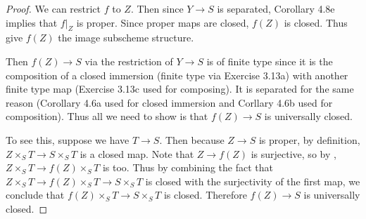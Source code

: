 \begin{proof}
	We can restrict $f $ to $Z $.
	Then since $Y \to S $ is separated, Corollary 4.8e implies that $f\left.\right|_{Z} $ is proper.
	Since proper maps are closed, $f(Z) $ is closed.
	Thus give $f(Z) $ the image subscheme structure.

	Then $f(Z) \to S $ via the restriction of $Y\to S $ is of finite type since it is the composition of a closed immersion (finite type via Exercise 3.13a) with another finite type map (Exercise 3.13c used for composing).
	It is separated for the same reason (Corollary 4.6a used for closed immersion and Corllary 4.6b used for composition).
	Thus all we need to show is that $f(Z) \to S $ is universally closed.

	To see this, suppose we have $T\to S $.
	Then because $Z\to S $ is proper, by definition, $Z\times_S T \to S \times_S T $ is a closed map.
	Note that $Z\to f(Z) $ is surjective, so by , $Z \times _S T \to f(Z) \times _S T $ is too.
	Thus by combining the fact that $Z\times _S T \to f(Z) \times _S T \to S \times _S T $ is closed with the surjectivity of the first map, we conclude that $f(Z) \times _S T \to S \times _S T $ is closed.
	Therefore $f(Z) \to S $ is universally closed.


\end{proof}
